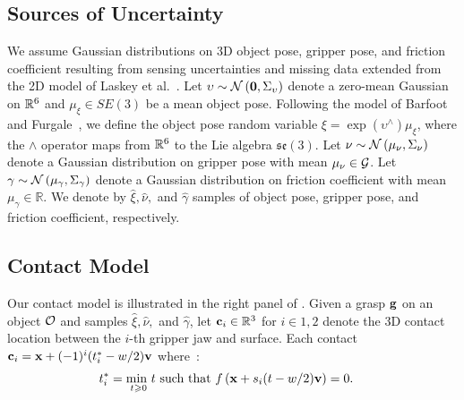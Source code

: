\subsection{Sources of Uncertainty}
We assume Gaussian distributions on 3D object pose, gripper pose, and friction coefficient resulting from sensing uncertainties and missing data extended from the 2D model of Laskey et al.~\cite{laskey2015bandits}.
Let $\upsilon \sim \mathcal{N}\left(\mathbf{0}, \Sigma_{\upsilon}\right)$ denote a zero-mean Gaussian on $\mathbb{R}^6$ and $\mu_{\xi} \in SE(3)$ be a mean object pose.
Following the model of Barfoot and Furgale~\cite{barfoot2014associating}, we define the object pose random variable $\xi = \exp\left( \upsilon^{\wedge} \right) \mu_{\xi}$, where the $\wedge$ operator maps from $\mathbb{R}^6$ to the Lie algebra $\mathfrak{se}(3)$.
Let $\nu \sim \mathcal{N}\left(\mu_{\nu}, \Sigma_{\nu}\right)$ denote a Gaussian distribution on gripper pose with mean $\mu_{\nu} \in \mathcal{G}$.
Let $\gamma \sim \mathcal{N}\left(\mu_{\gamma}, \Sigma_{\gamma} \right)$ denote a Gaussian distribution on friction coefficient with mean $\mu_{\gamma} \in \mathbb{R}$.
We denote by $\hat{\xi}, \hat{\nu},$ and $\hat{\gamma}$ samples of object pose, gripper pose, and friction coefficient, respectively. 

\subsection{Contact Model}
Our contact model is illustrated in the right panel of .
Given a grasp $\mathbf{g}$ on an object $\mathcal{O}$ and samples $\hat{\xi}, \hat{\nu},$ and $\hat{\gamma}$, let $\mathbf{c}_i \in \mathbb{R}^3$ for $i \in {1, 2}$ denote the 3D contact location between the $i$-th gripper jaw and surface.
Each contact $\mathbf{c}_i = \mathbf{x} + (-1)^{i} (t_i^* - w / 2) \mathbf{v}$ where~\cite{mahler2015gp}:
\begin{align*}
	t_i^* &= \underset{t \geqslant 0}{\text{min }} t \text{ such that } f\left(\mathbf{x} + s_i (t - w / 2) \mathbf{v}\right) = 0.
\end{align*}


